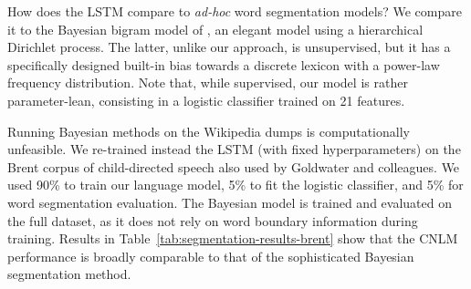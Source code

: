 How does the LSTM compare to \emph{ad-hoc} word segmentation models?
We compare it to the Bayesian bigram model of
, an elegant model using a
hierarchical Dirichlet process.  The latter, unlike our approach, is
unsupervised, but it has a specifically designed built-in bias towards
a discrete lexicon with a power-law frequency distribution. Note that,
while supervised, our model is rather parameter-lean, consisting in a
logistic classifier trained on 21 features.

Running Bayesian methods on the Wikipedia dumps is computationally
unfeasible. We re-trained instead the LSTM (with fixed
hyperparameters) on the Brent corpus of child-directed speech
\cite{brent-efficient-1999} also used by Goldwater and colleagues.  We
used 90\% to train our language model, 5\% to fit the logistic
classifier, and 5\% for word segmentation evaluation.  The Bayesian
model is trained and evaluated on the full dataset, as it does not
rely on word boundary information during training. Results in
Table~\ref{tab:segmentation-results-brent} show that the CNLM
performance is broadly comparable to that of the sophisticated Bayesian
segmentation method.



